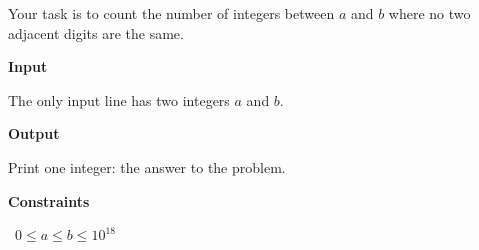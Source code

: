 Your task is to count the number of integers between $a$ and $b$ where no two adjacent digits are the same.

\vspace{0.3cm}\noindent\textbf{Input}

The only input line has two integers $a$ and $b$.

\vspace{0.3cm}\noindent\textbf{Output}

Print one integer: the answer to the problem.

\vspace{0.3cm}\noindent\textbf{Constraints}

\textbullet\ $0 \le a \le b \le 10^{18}$